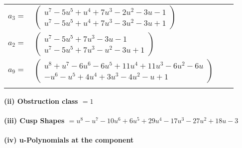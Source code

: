 \documentclass[1p]{elsarticle_modified}
\theoremstyle{definition}
\begin{document}
\begin{tabular}{m{7pt} m{180pt} m{7pt} m{180pt} }
\flushright $a_{3}=$&$\begin{pmatrix}u^7-5 u^5+u^4+7 u^3-2 u^2-3 u-1\\u^7-5 u^5+u^4+7 u^3-3 u^2-3 u+1\end{pmatrix}$ \\
\flushright $a_{2}=$&$\begin{pmatrix}u^7-5 u^5+7 u^3-3 u-1\\u^7-5 u^5+7 u^3- u^2-3 u+1\end{pmatrix}$ \\
\flushright $a_{9}=$&$\begin{pmatrix}u^8+u^7-6 u^6-6 u^5+11 u^4+11 u^3-6 u^2-6 u\\- u^6- u^5+4 u^4+3 u^3-4 u^2- u+1\end{pmatrix}$\\&\end{tabular}
\flushleft \textbf{(ii) Obstruction class $= 1$}\\~\\
\flushleft \textbf{(iii) Cusp Shapes $= u^8- u^7-10 u^6+6 u^5+29 u^4-17 u^3-27 u^2+18 u-3$}\\~\\
\newpage\renewcommand{\arraystretch}{1}
\flushleft \textbf{(iv) u-Polynomials at the component}\newline \\
\end{document}
